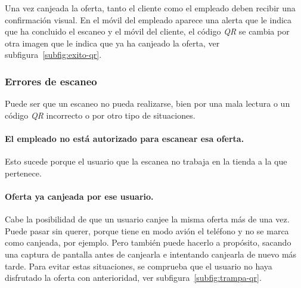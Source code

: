 Una vez canjeada la oferta, tanto el cliente como el empleado deben recibir una confirmación visual. En el móvil del empleado aparece una alerta que le indica que ha concluido el escaneo y el móvil del cliente, el código \textit{QR} se cambia por otra imagen que le indica que ya ha canjeado la oferta, ver subfigura~\ref{subfig:exito-qr}.

\subsubsection{Errores de escaneo}
Puede ser que un escaneo no pueda realizarse, bien por una mala lectura o un código \textit{QR} incorrecto o por otro tipo de situaciones.

\paragraph{El empleado no está autorizado para escanear esa oferta.} Esto sucede porque el usuario que la escanea no trabaja en la tienda a la que pertenece.

\paragraph{Oferta ya canjeada por ese usuario.} Cabe la posibilidad de que un usuario canjee la misma oferta más de una vez. Puede pasar sin querer, porque tiene en modo avión el teléfono y no se marca como canjeada, por ejemplo. Pero también puede hacerlo a propósito, sacando una captura de pantalla antes de canjearla e intentando canjearla de nuevo más tarde. Para evitar estas situaciones, se comprueba que el usuario no haya disfrutado la oferta con anterioridad, ver subfigura~\ref{subfig:trampa-qr}.

